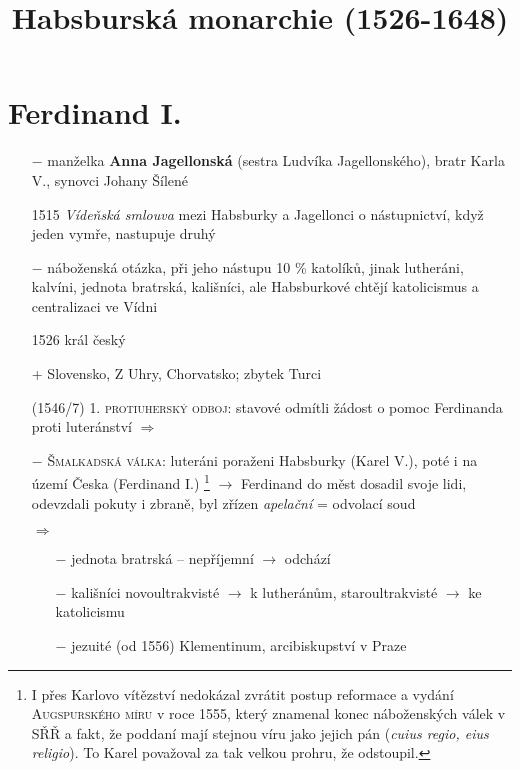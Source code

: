 \documentclass{article}
\title{\vspace{-2cm}Habsburská monarchie (1526-1648)\vspace{-1.7cm}}
\date{}
\author{}
\begin{document}
\maketitle

\section*{Ferdinand I. }
\begin{itemize}
    \vspace{-0.5em}
    \setlength\itemsep{0.15em}
    \item[$-$] manželka \textbf{Anna Jagellonská} (sestra Ludvíka Jagellonského), bratr Karla V., synovci Johany Šílené
    \item[1515] \textit{Vídeňská smlouva} mezi Habsburky a Jagellonci o nástupnictví, když jeden vymře, nastupuje druhý
    \item[$-$] náboženská otázka, při jeho nástupu 10 \% katolíků, jinak lutheráni, kalvíni, jednota bratrská, kališníci, ale Habsburkové chtějí katolicismus a centralizaci ve Vídni
    \item[1526] král český
    \item[+] Slovensko, Z Uhry, Chorvatsko; zbytek Turci
    \item[(1546/7)] \textsc{1. protiuherský odboj}: stavové odmítli žádost o pomoc Ferdinanda proti luteránství $\Rightarrow$
    \item[$-$] \textsc{Šmalkadská válka}: luteráni poraženi Habsburky (Karel V.), poté i na území Česka (Ferdinand I.) \footnote{I přes Karlovo vítězství nedokázal zvrátit postup reformace a vydání \textsc{Augspurského míru} v roce 1555, který znamenal konec náboženských válek v SŘŘ a fakt, že poddaní mají stejnou víru jako jejich pán (\textit{cuius regio, eius religio}). To Karel považoval za tak velkou prohru, že odstoupil.} $\rightarrow$ Ferdinand do měst dosadil svoje lidi, odevzdali pokuty i zbraně, byl zřízen \textit{apelační} = odvolací soud
    \item[$\Rightarrow$] \begin{itemize}
        \vspace{-0.5em}
        \setlength\itemsep{0.15em}
        \item[$-$] jednota bratrská -- nepříjemní $\rightarrow$ odchází
        \item[$-$] kališníci novoultrakvisté $\rightarrow$ k lutheránům, staroultrakvisté $\rightarrow$ ke katolicismu
        \item[$-$] jezuité (od 1556) Klementinum, arcibiskupství v Praze
    \end{itemize}
\end{itemize}
\end{document}
